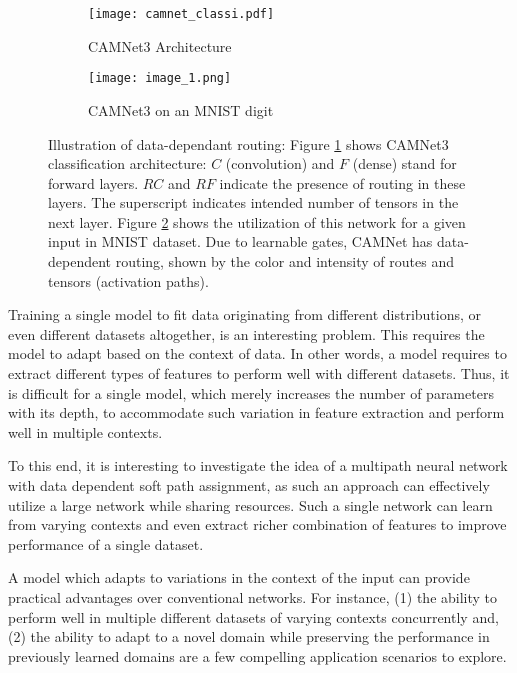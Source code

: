 \documentclass[10pt,twocolumn,letterpaper]{article}
\begin{document}
\begin{figure}[t]
	\begin{center}
		\begin{subfigure}[]{0.95\linewidth}
			\texttt{[image: camnet\_classi.pdf]} 
			\caption{CAMNet3 Architecture}
			\label{fig:1a}
		\end{subfigure}
		\begin{subfigure}[]{1\linewidth}
			\texttt{[image: image\_1.png]} 
			\caption{CAMNet3 on an MNIST digit}
			\label{fig:1b}
		\end{subfigure}
	\end{center}
	\vspace{-0.25in}
\caption{Illustration of data-dependant routing: Figure \ref{fig:1a} shows CAMNet3 classification architecture: $C$ (convolution) and $F$ (dense) stand for forward layers. $RC$ and $RF$ indicate the presence of routing in these layers. The superscript indicates intended number of tensors in the next layer.  Figure \ref{fig:1b} shows the utilization of this network for a given input in MNIST dataset. Due to learnable gates, CAMNet has data-dependent routing, shown by the color and intensity of routes and tensors (activation paths). }
	\label{fig:camnet_classi}
	\vspace{-0.15in}
\end{figure}

Training a single model to fit data originating from different distributions, or even different datasets altogether, is an interesting problem. This requires the model to adapt based on the context of data. In other words, a model requires to extract different types of features to perform well with different datasets. Thus, it is difficult for a single model, which merely increases the number of  parameters with its depth, to accommodate such variation in feature extraction and perform well in multiple contexts. 

To this end, it is interesting to investigate the idea of a multipath neural network with data dependent soft path assignment,
as such an approach can effectively utilize a large network while sharing resources. Such a single network can learn from varying contexts and even extract richer combination of features to improve performance of a single dataset. 






A model which adapts to variations in the context of the input can provide practical advantages over conventional networks. For instance, (1) the ability to perform well in multiple different datasets of varying contexts concurrently and, (2) the ability to adapt to a novel domain while preserving the performance in previously learned domains are a few compelling application scenarios to explore.
\end{document}
